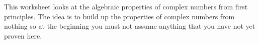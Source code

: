 This worksheet looks at the algebraic properties of complex numbers from first
principles. The idea is to build up the properties of complex numbers from
nothing so at the beginning you must not assume anything that you have not yet
proven here.
